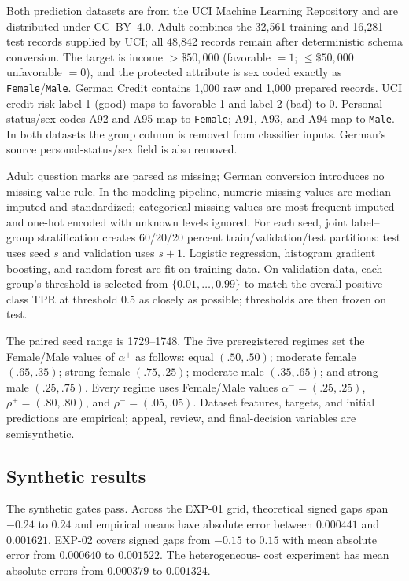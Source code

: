 \documentclass[manuscript,screen,review]{jair}
\begin{document}
Both prediction datasets are from the UCI Machine Learning Repository and are
distributed under CC~BY~4.0.  Adult combines the 32,561 training and 16,281
test records supplied by UCI; all 48,842 records remain after deterministic
schema conversion.  The target is income $>\$50{,}000$ (favorable $=1$;
$\le\$50{,}000$ unfavorable $=0$), and the protected attribute is sex coded
exactly as \texttt{Female}/\texttt{Male}.  German Credit contains 1,000 raw
and 1,000 prepared records.  UCI credit-risk label 1 (good) maps to favorable
1 and label 2 (bad) to 0.  Personal-status/sex codes A92 and A95 map to
\texttt{Female}; A91, A93, and A94 map to \texttt{Male}.  In both datasets the
group column is removed from classifier inputs.  German's source
personal-status/sex field is also removed.

Adult question marks are parsed as missing; German conversion introduces no
missing-value rule.  In the modeling pipeline, numeric missing values are
median-imputed and standardized; categorical missing values are
most-frequent-imputed and one-hot encoded with unknown levels ignored.  For
each seed, joint label--group stratification creates 60/20/20 percent
train/validation/test partitions: test uses seed $s$ and validation uses
$s+1$.  Logistic regression, histogram gradient boosting, and random forest
are fit on training data.  On validation data, each group's threshold is
selected from $\{0.01,\ldots,0.99\}$ to match the overall positive-class TPR
at threshold 0.5 as closely as possible; thresholds are then frozen on test.

The paired seed range is 1729--1748.  The five preregistered regimes set the
Female/Male values of $\alpha^+$ as follows: equal $(.50,.50)$; moderate
female $(.65,.35)$; strong female $(.75,.25)$; moderate male $(.35,.65)$; and
strong male $(.25,.75)$.  Every regime uses Female/Male values
$\alpha^-=(.25,.25)$, $\rho^+=(.80,.80)$, and $\rho^-=(.05,.05)$.  Dataset
features, targets, and initial predictions are empirical; appeal, review, and
final-decision variables are semisynthetic.

\subsection{Synthetic results}

The synthetic gates pass.  Across the EXP-01 grid, theoretical signed gaps
span $-0.24$ to $0.24$ and empirical means have absolute error between
$0.000441$ and $0.001621$.  EXP-02 covers signed gaps from $-0.15$ to $0.15$
with mean absolute error from $0.000640$ to $0.001522$.  The heterogeneous-
cost experiment has mean absolute errors from $0.000379$ to $0.001324$.
\end{document}
